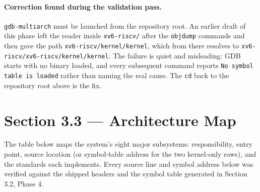\documentclass[11pt]{article}
\renewcommand{\_}{\origunderscore\allowbreak}
\begin{document}
\paragraph{Correction found during the validation pass.}
\texttt{gdb-multiarch} must be launched from the repository root. An earlier draft of this phase left the reader inside \texttt{xv6-riscv/} after the \texttt{objdump} commands and then gave the path \texttt{xv6-riscv/kernel/kernel}, which from there resolves to \texttt{xv6-riscv/\allowbreak{}xv6-riscv/\allowbreak{}kernel/\allowbreak{}kernel}. The failure is quiet and misleading: GDB starts with no binary loaded, and every subsequent command reports \texttt{No symbol table is loaded} rather than naming the real cause. The \texttt{cd} back to the repository root above is the fix.

\section*{Section 3.3 --- Architecture Map}

The table below maps the system's eight major subsystems: responsibility, entry point, source location (or symbol-table address for the two kernel-only rows), and the standards each implements. Every source line and symbol address below was verified against the shipped headers and the symbol table generated in Section 3.2, Phase 4.
\end{document}
